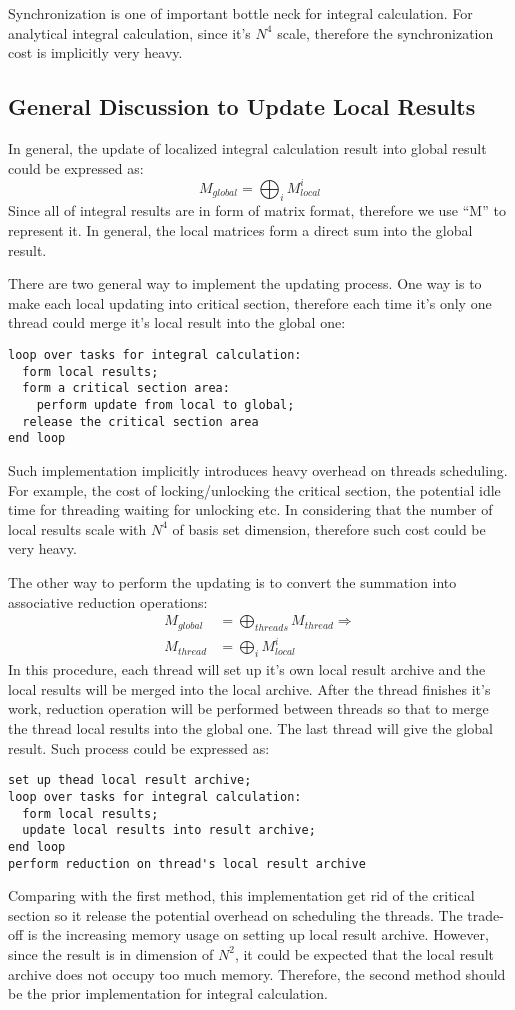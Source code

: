 Synchronization is one of important bottle neck for integral calculation. For 
analytical integral calculation, since it's $N^{4}$ scale, therefore the synchronization
cost is implicitly very heavy. 

\subsection{General Discussion to Update Local Results}
%
%
%
In general, the update of localized integral calculation result into global result
could be expressed as:
\begin{equation}
	M_{global} = \bigoplus_{i} M_{local}^{i}
\end{equation}
Since all of integral results are in form of matrix format, therefore we use ``M''
to represent it. In general, the local matrices form a direct sum into the global
result.

There are two general way to implement the updating process. One way is to make
each local updating into critical section, therefore each time it's only one 
thread could merge it's local result into the global one:
\begin{verbatim}
loop over tasks for integral calculation:
  form local results;
  form a critical section area:
    perform update from local to global;
  release the critical section area
end loop
\end{verbatim}
Such implementation implicitly introduces heavy overhead on threads scheduling.
For example, the cost of locking/unlocking the critical section, the potential
idle time for threading waiting for unlocking etc. In considering that the 
number of local results scale with $N^{4}$ of basis set dimension, therefore 
such cost could be very heavy.

The other way to perform the updating is to convert the summation into associative 
reduction operations:
\begin{align}
	M_{global} &= \bigoplus_{threads} M_{thread} \Rightarrow \nonumber \\
	M_{thread} &= \bigoplus_{i} M_{local}^{i}
\end{align}
In this procedure, each thread will set up it's own local result archive and the local
results will be merged into the local archive. After the thread finishes it's work,
reduction operation will be performed between threads so that to merge the thread 
local results into the global one. The last thread will give the global result. Such 
process could be expressed as:
\begin{verbatim}
set up thead local result archive;
loop over tasks for integral calculation:
  form local results;
  update local results into result archive;
end loop
perform reduction on thread's local result archive
\end{verbatim}
Comparing with the first method, this implementation get rid of the critical section
so it release the potential overhead on scheduling the threads. The trade-off is 
the increasing memory usage on setting up local result archive. However, since 
the result is in dimension of $N^{2}$, it could be expected that the local
result archive does not occupy too much memory. Therefore, the second method 
should be the prior implementation for integral calculation. 


